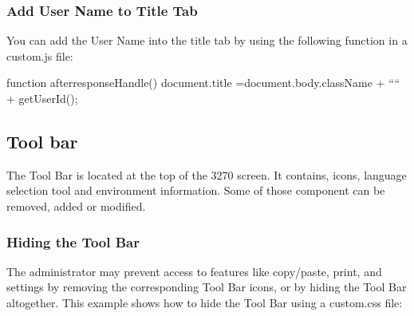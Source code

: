\documentclass[letterpaper,10pt,english]{sphinxmanual}
\begin{document}
\subsubsection{Add User Name to Title Tab}
\label{\detokenize{Customization:add-user-name-to-title-tab}}\label{\detokenize{Customization:index-16}}
You can add the User Name into the title tab by using the following function in a custom.js file:

\begin{sphinxVerbatim}[commandchars=\\\{\}]
function after\PYGZus{}responseHandle() \PYGZob{}
    document.title =document.body.className + “\PYGZhy{}“ + getUserId();
\PYGZcb{}
\end{sphinxVerbatim}



\subsection{Tool bar}
\label{\detokenize{Customization:tool-bar}}
The Tool Bar is located at the top of the 3270 screen. It contains, icons, language selection tool and environment
information. Some of those component can be removed, added or modified.

\ignorespaces 

\subsubsection{Hiding the Tool Bar}
\label{\detokenize{Customization:hiding-the-tool-bar}}\label{\detokenize{Customization:index-17}}
The administrator may prevent access to features like copy/paste, print, and settings by removing the corresponding Tool Bar icons, or by hiding the Tool Bar altogether. This example shows how to hide the Tool Bar using a custom.css file:

\begin{sphinxVerbatim}[commandchars=\\\{\}]
        
       
\end{sphinxVerbatim}
\end{document}

